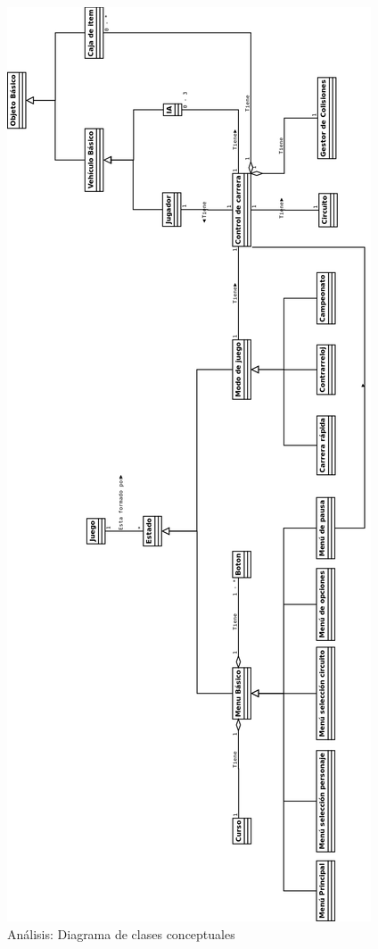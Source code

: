 \begin{figure}[H]
  \label{diagrama_clases_conceptuales}
  \begin{center}
    \includegraphics[scale=0.3]{imagenes/analisis/diagrama_clases_conceptuales.png}
  \end{center}
  \caption{Análisis: Diagrama de clases conceptuales}
\end{figure}

